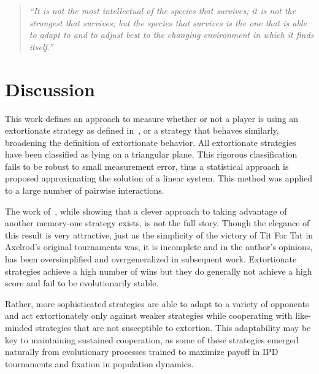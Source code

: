 \documentclass[a4paper]{article}
\begin{document}
\begin{quote}

    \textit{``It is not the most intellectual of the species that survives; it is not the
strongest that survives; but the species that survives is the one that is able
to adapt to and to adjust best to the changing environment in which it finds
    itself.''}
\end{quote}

\section{Discussion}\label{sec:conclusion}

This work defines an approach to measure whether or not a player is using an
extortionate strategy as defined in~\cite{Press2012}, or a strategy that behaves
similarly, broadening the definition of extortionate behavior. All extortionate
strategies have been classified as lying on a triangular plane. This rigorous
classification fails to be robust to small measurement error, thus a statistical
approach is proposed approximating the solution of a linear system.
This method
was applied to a large number of pairwise interactions.

The work of~\cite{Press2012}, while showing that a clever approach to taking
advantage of another memory-one strategy exists, is not the full story.
Though the elegance of this result is very attractive, just as the simplicity of
the victory of Tit For Tat in Axelrod's original tournaments was, it is
incomplete and in the author's opinions, has been oversimplified and
overgeneralized in subsequent work. Extortionate strategies achieve a high
number of wins but they do generally not achieve a high score and fail to be
evolutionarily stable.

Rather, more sophisticated strategies are able to adapt to a variety of opponents
and act extortionately only against weaker strategies while cooperating with
like-minded strategies that are not susceptible to extortion. This adaptability
may be key to maintaining sustained cooperation, as some of these strategies
emerged naturally from evolutionary processes trained to maximize payoff in
IPD tournaments and fixation in population dynamics.
\end{document}
